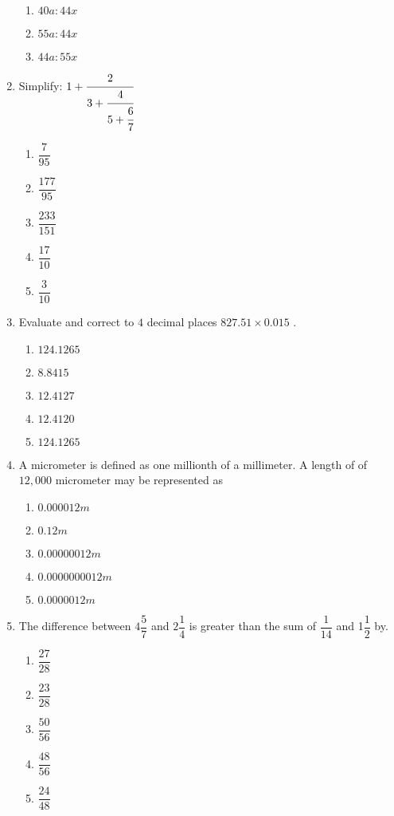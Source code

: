 \begin{multicols}{2}
\begin{enumerate}[label={\arabic*.}]
\begin{enumerate}[label={\Alph*.}]
    \item \(40a:44x\)
    \item \(55a:44x\)
    \item \(44a:55x\)
    \end{enumerate}
\item Simplify: \(1 + {\cfrac{2}{3 + \cfrac{4}{5+ \cfrac{6}{7}}}}\)
    \begin{enumerate}[label={\Alph*.}]
    \item \(\dfrac{7}{95}\)
    \item \(\dfrac{177}{95}\)
    \item \(\dfrac{233}{151}\)
    \item \(\dfrac{17}{10}\)
    \item \(\dfrac{3}{10}\)
    \end{enumerate}
\item Evaluate and correct to \(4\) decimal places \(827.51 \times 0.015\) .
    \begin{enumerate}[label={\Alph*.}]
    \item \(124.1265\)
    \item \(8.8415\)
    \item \(12.4127\)
    \item \(12.4120\)
    \item \(124.1265\)
    \end{enumerate}
\item A micrometer is defined as one millionth of a millimeter. A length of of \(12,000\) micrometer may be represented as
    \begin{enumerate}[label={\Alph*.}]
    \item \(0.000012m\)
    \item \(0.12m\)
    \item \(0.00000012m\)
    \item \(0.0000000012m\)
    \item \(0.0000012m\)
    \end{enumerate}
\item The difference between \(4{\dfrac{5}{7}}\) and \(2{\dfrac{1}{4}}\) is greater than the sum of \(\dfrac{1}{14}\) and 1\(\dfrac{1}{2}\) by.
    \begin{enumerate}[label={\Alph*.}]
    \item \(\dfrac{27}{28}\)
    \item \(\dfrac{23}{28}\)
    \item \(\dfrac{50}{56}\)
    \item \(\dfrac{48}{56}\)
    \item \(\dfrac{24}{48}\)

\end{enumerate}
\end{enumerate}
\end{multicols}
